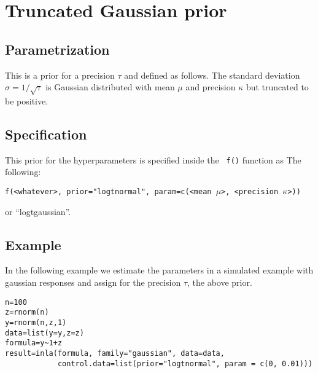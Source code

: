 \documentclass[a4paper,11pt]{article}
\begin{document}
\section*{Truncated Gaussian prior}

\subsection*{Parametrization}
This is a prior for a precision $\tau$ and defined as follows.  The
standard deviation $\sigma = 1/\sqrt{\tau}$ is Gaussian distributed
with mean $\mu$ and precision $\kappa$ but truncated to be positive.

\subsection*{Specification}
This prior for the hyperparameters is specified inside the {\tt
    f()} function as The following:
\begin{center}
{\tt f(<whatever>, prior="logtnormal", param=c(<mean $\mu$>, <precision $\kappa$>))}
\end{center}
or ``logtgaussian''.

\subsection*{Example}

In the following example we estimate the parameters in a simulated
example with gaussian responses and assign for the precision
$\tau$, the above prior.
\begin{verbatim}
n=100
z=rnorm(n)
y=rnorm(n,z,1)
data=list(y=y,z=z)
formula=y~1+z
result=inla(formula, family="gaussian", data=data,
            control.data=list(prior="logtnormal", param = c(0, 0.01)))
\end{verbatim}
\end{document}
